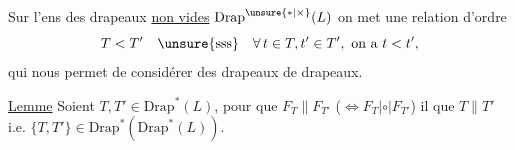 Sur l'ens des drapeaux \uline{non vides} $\mathrm{Drap}^{\unsure{*|\times}}(L)$ on met une relation d'ordre
\[
 T<T'\quad\text{\unsure{sss}}\quad \forall\,t\in T,t'\in T',\ \text{on a }t<t',
\]
qui nous permet de considérer des drapeaux de drapeaux.

\uline{Lemme} Soient $T,T'\in\mathrm{Drap}^{*}(L)$, pour que $F_T\parallel F_{T'}$ ($\Leftrightarrow F_T\mathrel{|\circ|}F_{T'}$) il  que $T\parallel T'$  i.e. $\{T,T'\}\in\mathrm{Drap}^{*}(\mathrm{Drap}^{*}(L))$.
